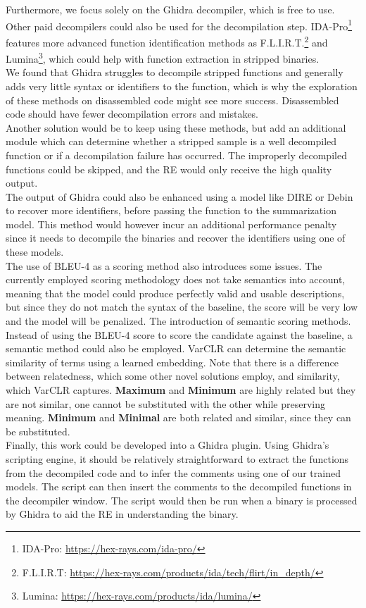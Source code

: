 Furthermore, we focus solely on the Ghidra decompiler, which is free to use. Other paid decompilers could also be used for the decompilation step. IDA-Pro\footnote{IDA-Pro: \url{https://hex-rays.com/ida-pro/}} features more advanced function identification methods as F.L.I.R.T.\footnote{F.L.I.R.T: \url{https://hex-rays.com/products/ida/tech/flirt/in_depth/}} and Lumina\footnote{Lumina: \url{https://hex-rays.com/products/ida/lumina/}}, which could help with function extraction in stripped binaries.\\
We found that Ghidra struggles to decompile stripped functions and generally adds very little syntax or identifiers to the function, which is why the exploration of these methods on disassembled code might see more success. Disassembled code should have fewer decompilation errors and mistakes.\\
Another solution would be to keep using these methods, but add an additional module which can determine whether a stripped sample is a well decompiled function or if a decompilation failure has occurred. The improperly decompiled functions could be skipped, and the RE would only receive the high quality output.\\
The output of Ghidra could also be enhanced using a model like DIRE \cite{Dire} or Debin \cite{Debin} to recover more identifiers, before passing the function to the summarization model. This method would however incur an additional performance penalty since it needs to decompile the binaries and recover the identifiers using one of these models.\\

The use of BLEU-4 as a scoring method also introduces some issues. The currently employed scoring methodology does not take semantics into account, meaning that the model could produce perfectly valid and usable descriptions, but since they do not match the syntax of the baseline, the score will be very low and the model will be penalized. The introduction of semantic scoring methods. Instead of using the BLEU-4 score to score the candidate against the baseline, a semantic method could also be employed. VarCLR \cite{VarCLR} can determine the semantic similarity of terms using a learned embedding. Note that there is a difference between relatedness, which some other novel solutions employ, and similarity, which VarCLR captures. \textbf{Maximum} and \textbf{Minimum} are highly related but they are not similar, one cannot be substituted with the other while preserving meaning. \textbf{Minimum} and \textbf{Minimal} are both related and similar, since they can be substituted. \\

Finally, this work could be developed into a Ghidra plugin. Using Ghidra's scripting engine, it should be relatively straightforward to extract the functions from the decompiled code and to infer the comments using one of our trained models. The script can then insert the comments to the decompiled functions in the decompiler window. The script would then be run when a binary is processed by Ghidra to aid the RE in understanding the binary.
